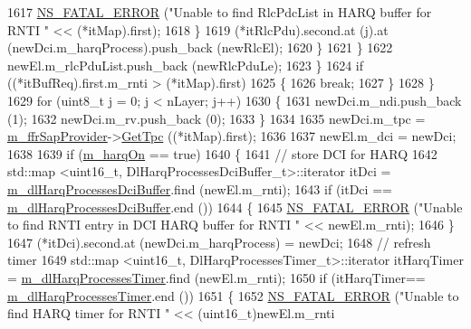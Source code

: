 \begin{DoxyCode}
1617                           \hyperlink{group__fatal_ga5131d5e3f75d7d4cbfd706ac456fdc85}{NS\_FATAL\_ERROR} (\textcolor{stringliteral}{"Unable to find RlcPdcList in HARQ buffer for RNTI 
      "} << (*itMap).first);
1618                         \}
1619                       (*itRlcPdu).second.at (j).at (newDci.m\_harqProcess).push\_back (newRlcEl);
1620                     \}
1621                 \}
1622               newEl.m\_rlcPduList.push\_back (newRlcPduLe);
1623             \}
1624           \textcolor{keywordflow}{if} ((*itBufReq).first.m\_rnti > (*itMap).first)
1625             \{
1626               \textcolor{keywordflow}{break};
1627             \}
1628         \}
1629       \textcolor{keywordflow}{for} (uint8\_t j = 0; j < nLayer; j++)
1630         \{
1631           newDci.m\_ndi.push\_back (1);
1632           newDci.m\_rv.push\_back (0);
1633         \}
1634 
1635       newDci.m\_tpc = \hyperlink{classns3_1_1PssFfMacScheduler_a8b7889293dd002f806e2d6afd9c50aed}{m\_ffrSapProvider}->\hyperlink{classns3_1_1LteFfrSapProvider_a0021d72c12fdaddd3817ef0eb5a7cd4e}{GetTpc} ((*itMap).first);
1636 
1637       newEl.m\_dci = newDci;
1638 
1639       \textcolor{keywordflow}{if} (\hyperlink{classns3_1_1PssFfMacScheduler_a7163e6149892abe4c17ce95be6bf1953}{m\_harqOn} == \textcolor{keyword}{true})
1640         \{
1641           \textcolor{comment}{// store DCI for HARQ}
1642           std::map <uint16\_t, DlHarqProcessesDciBuffer\_t>::iterator itDci = 
      \hyperlink{classns3_1_1PssFfMacScheduler_a167441dd2a0e5cde664eedfd19a07fbf}{m\_dlHarqProcessesDciBuffer}.find (newEl.m\_rnti);
1643           \textcolor{keywordflow}{if} (itDci == \hyperlink{classns3_1_1PssFfMacScheduler_a167441dd2a0e5cde664eedfd19a07fbf}{m\_dlHarqProcessesDciBuffer}.end ())
1644             \{
1645               \hyperlink{group__fatal_ga5131d5e3f75d7d4cbfd706ac456fdc85}{NS\_FATAL\_ERROR} (\textcolor{stringliteral}{"Unable to find RNTI entry in DCI HARQ buffer for RNTI "} << 
      newEl.m\_rnti);
1646             \}
1647           (*itDci).second.at (newDci.m\_harqProcess) = newDci;
1648           \textcolor{comment}{// refresh timer}
1649           std::map <uint16\_t, DlHarqProcessesTimer\_t>::iterator itHarqTimer =  
      \hyperlink{classns3_1_1PssFfMacScheduler_afcae17e3f08b0a6f1e1458a39da8cdcb}{m\_dlHarqProcessesTimer}.find (newEl.m\_rnti);
1650           \textcolor{keywordflow}{if} (itHarqTimer== \hyperlink{classns3_1_1PssFfMacScheduler_afcae17e3f08b0a6f1e1458a39da8cdcb}{m\_dlHarqProcessesTimer}.end ())
1651             \{
1652               \hyperlink{group__fatal_ga5131d5e3f75d7d4cbfd706ac456fdc85}{NS\_FATAL\_ERROR} (\textcolor{stringliteral}{"Unable to find HARQ timer for RNTI "} << (uint16\_t)newEl.m\_rnti

\end{DoxyCode}

